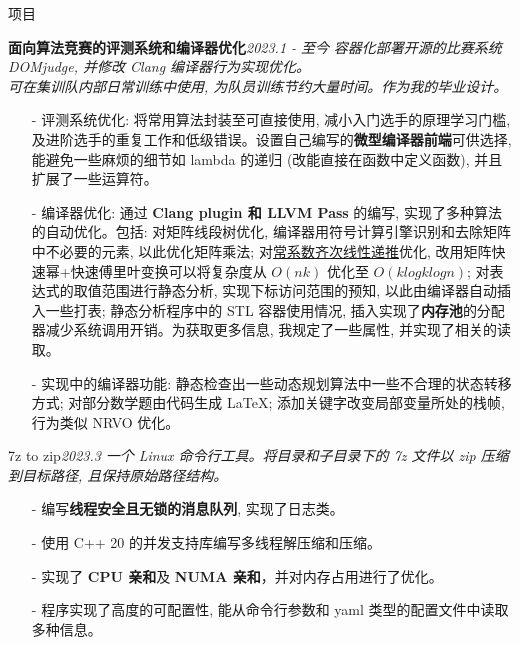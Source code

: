 \documentclass{resume} %
\begin{document}
\begin{rSection}{项目}

\begin{rSubsection}
    {\textbf{面向算法竞赛的评测系统和编译器优化}}{\em 2023.1 - 至今}
    {\textit{容器化部署开源的比赛系统 DOMjudge, 并修改 Clang 编译器行为实现优化。}\\}
    {\textit{可在集训队内部日常训练中使用, 为队员训练节约大量时间。作为我的毕业设计。}}
    \item[]
    \begin{itemize}
        \setlength\itemsep{-0.5em}
        \item[-] 评测系统优化: 将常用算法封装至可直接使用, 减小入门选手的原理学习门槛, 及进阶选手的重复工作和低级错误。设置自己编写的\textbf{微型编译器前端}可供选择, 能避免一些麻烦的细节如 lambda 的递归 (改能直接在函数中定义函数), 并且扩展了一些运算符。
        \item[-] 编译器优化: 通过 \textbf{Clang plugin 和 LLVM Pass} 的编写, 实现了多种算法的自动优化。包括: 对矩阵线段树优化, 编译器用符号计算引擎识别和去除矩阵中不必要的元素, 以此优化矩阵乘法; 对\href{https://oi-wiki.org/math/poly/linear-recurrence/}{常系数齐次线性递推}优化, 改用矩阵快速幂+快速傅里叶变换可以将复杂度从 $O(nk)$ 优化至 $O(klogklogn)$; 对表达式的取值范围进行静态分析, 实现下标访问范围的预知, 以此由编译器自动插入一些打表; 静态分析程序中的 STL 容器使用情况, 插入实现了\textbf{内存池}的分配器减少系统调用开销。为获取更多信息, 我规定了一些属性, 并实现了相关的读取。
        \item[-] 实现中的编译器功能: 静态检查出一些动态规划算法中一些不合理的状态转移方式; 对部分数学题由代码生成 \LaTeX; 添加关键字改变局部变量所处的栈帧, 行为类似 NRVO 优化。
    \end{itemize}
\end{rSubsection}

\begin{rSubsection}
	{7z to zip}{\em 2023.3}
	{\textit{一个 Linux 命令行工具。将目录和子目录下的 7z 文件以 zip 压缩到目标路径, 且保持原始路径结构。}}
	{\textit{}}
	\item[]
	\begin{itemize}
		\setlength\itemsep{-0.5em}
		\item[-] 编写\textbf{线程安全且无锁的消息队列}, 实现了日志类。
		\item[-] 使用 C++ 20 的并发支持库编写多线程解压缩和压缩。
		\item[-] 实现了 \textbf{CPU 亲和}及 \textbf{NUMA 亲和}，并对内存占用进行了优化。
		\item[-] 程序实现了高度的可配置性, 能从命令行参数和 yaml 类型的配置文件中读取多种信息。
	\end{itemize}
\end{rSubsection}


\end{rSection}
\end{document}
